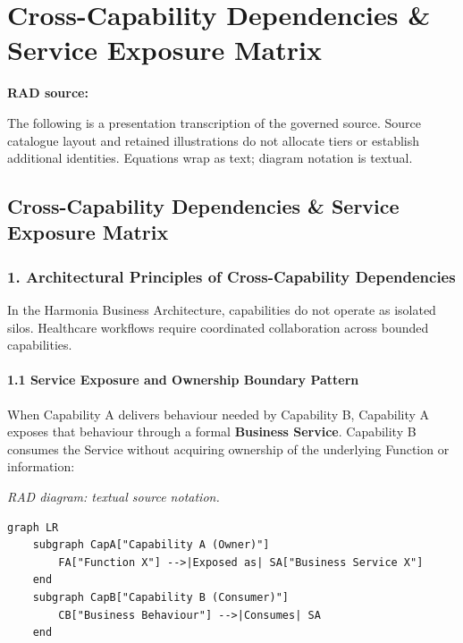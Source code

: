 \chapter{Cross-Capability Dependencies \& Service Exposure Matrix}\label{rad:dependencies}
\noindent\textbf{RAD source:} \texttt{}

The following is a presentation transcription of the governed source. Source catalogue layout and retained illustrations do not allocate tiers or establish additional identities. Equations wrap as text; diagram notation is textual.

\label{rad:dependencies:1}
\section*{Cross-Capability Dependencies \& Service Exposure Matrix}
\label{rad:dependencies:3}
\subsection*{1. Architectural Principles of Cross-Capability Dependencies}
\label{rad:dependencies:5}

In the Harmonia Business Architecture, capabilities do not operate as isolated silos. Healthcare workflows require coordinated collaboration across bounded capabilities.

\label{rad:dependencies:7}
\subsubsection*{1.1 Service Exposure and Ownership Boundary Pattern}
\label{rad:dependencies:9}

When Capability A delivers behaviour needed by Capability B, Capability A exposes that behaviour through a formal \textbf{Business Service}. Capability B consumes the Service without acquiring ownership of the underlying Function or information:

\label{rad:dependencies:11}

\textit{RAD diagram: textual source notation.}
\begin{Verbatim}[breaklines,fontsize=\footnotesize]
graph LR
    subgraph CapA["Capability A (Owner)"]
        FA["Function X"] -->|Exposed as| SA["Business Service X"]
    end
    subgraph CapB["Capability B (Consumer)"]
        CB["Business Behaviour"] -->|Consumes| SA
    end
\end{Verbatim}
\label{rad:dependencies:21}

